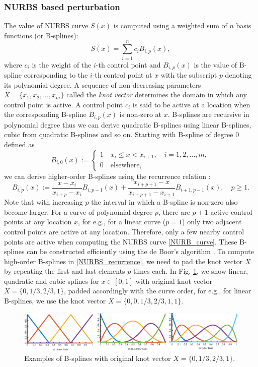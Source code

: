 \documentclass[review]{elsarticle}
\numberwithin{equation}{section}
\numberwithin{equation}{section}
\begin{document}
\subsubsection{NURBS based perturbation}
The value of NURBS curve $S(x)$ is computed using a weighted sum of $n$ basis functions (or B-splines):
\begin{equation}\label{NURB_curve}
S(x) = \sum_{i=1}^{n} c_i B_{i,p}(x),
\end{equation}
where $c_i$ is the weight of the $i$-th control point and $B_{i,p}(x)$ is the value of B-spline corresponding to the $i$-th control point at $x$ with the subscript $p$ denoting its polynomial degree. A sequence of non-decreasing parameters $X = \{x_1,x_2,...,x_m\}$ called the \textit{knot vector} determines the domain in which any control point is active. A control point $c_i$ is said to be active at a location when the corresponding B-spline $B_{i,p}(x)$ is non-zero at $x$. B-splines are recursive in polynomial degree thus we can derive quadratic B-splines using linear B-splines, cubic from quadratic B-splines and so on. Starting with B-spline of degree 0 defined as 
\begin{equation}\label{linearBspline}
B_{i,0}(x) :=
\begin{cases}
1\quad x_i\leq x < x_{i+1},\quad i = 1,2,...,m,\\
0\quad\text{elsewhere,}
\end{cases} 
\end{equation}
we can derive higher-order B-splines using the recurrence relation \cite{deBoor}:
\begin{equation}\label{NURBS_recurrence}
B_{i,p}(x) := \frac{x - x_i}{x_{i+p} - x_i}B_{i,p-1}(x) + \frac{x_{i+p+1} - x}{x_{i+p+1} - x_{i+1}}B_{i+1,p-1}(x),\quad p\geq1.
\end{equation}
Note that with increasing $p$ the interval in which a B-spline is non-zero also become larger. For a curve of polynomial degree $p$, there are $p+1$ active control points at any location $x$, for e.g., for a linear curve ($p=1$) only two adjacent control points are active at any location. Therefore, only a few nearby control points are active when computing the NURBS curve \eqref{NURB_curve}. These B-splines can be constructed efficiently using the de Boor's algorithm \cite{deBoor}. To compute high-order B-splines in \eqref{NURBS_recurrence}, we need to pad the knot vector $X$ by repeating the first and last elements $p$ times each. In Fig. \ref{basis_examples}, we show linear, quadratic and cubic splines for $x\in[0,1]$ with original knot vector $X = \{0,1/3,2/3,1\}$, padded accordingly with the curve order, for e.g., for linear B-splines, we use the knot vector $X = \{0,0,1/3,2/3,1,1\}$.
\begin{figure}[h!]
\centering
\includegraphics[trim={0 0cm 0 0cm},clip, scale=.75]{basis_example.eps}
\caption{Examples of B-splines with original knot vector $X = \{0,1/3,2/3,1\}$.}
\label{basis_examples}
\end{figure}
\end{document}

